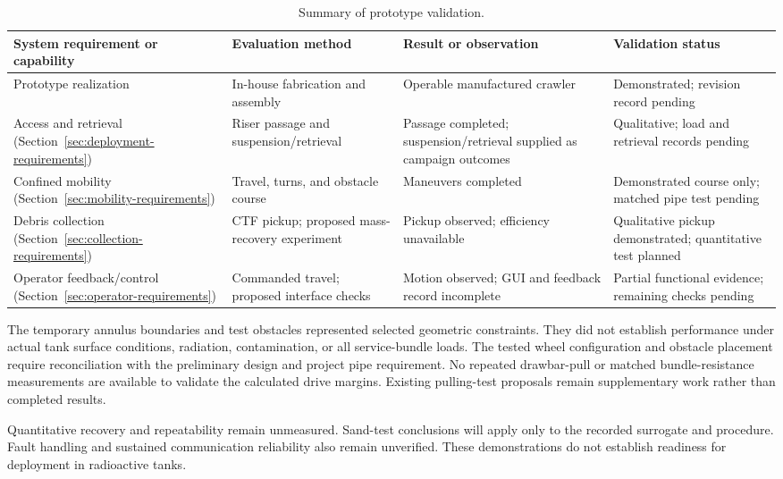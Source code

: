 \begin{table}[htbp]\centering
\caption{Summary of prototype validation.}
\label{tab:prototype-validation}
\begingroup\small\singlespacing\renewcommand{\arraystretch}{1.2}
\begin{tabularx}{\textwidth}{@{}XXXX@{}}\toprule
System requirement or capability & Evaluation method & Result or observation & Validation status \\\midrule
Prototype realization & In-house fabrication and assembly & Operable manufactured crawler & Demonstrated; revision record pending \\
Access and retrieval (Section~\ref{sec:deployment-requirements}) & Riser passage and suspension/retrieval & Passage completed; suspension/retrieval supplied as campaign outcomes & Qualitative; load and retrieval records pending \\
Confined mobility (Section~\ref{sec:mobility-requirements}) & Travel, turns, and obstacle course & Maneuvers completed & Demonstrated course only; matched pipe test pending \\
Debris collection (Section~\ref{sec:collection-requirements}) & CTF pickup; proposed mass-recovery experiment & Pickup observed; efficiency unavailable & Qualitative pickup demonstrated; quantitative test planned \\
Operator feedback/control (Section~\ref{sec:operator-requirements}) & Commanded travel; proposed interface checks & Motion observed; GUI and feedback record incomplete & Partial functional evidence; remaining checks pending \\
\bottomrule\end{tabularx}\endgroup
\end{table}

The temporary annulus boundaries and test obstacles represented selected geometric constraints. They did not establish performance under actual tank surface conditions, radiation, contamination, or all service-bundle loads. The tested wheel configuration and obstacle placement require reconciliation with the preliminary design and project pipe requirement. No repeated drawbar-pull or matched bundle-resistance measurements are available to validate the calculated drive margins. Existing pulling-test proposals remain supplementary work rather than completed results.

Quantitative recovery and repeatability remain unmeasured. Sand-test conclusions will apply only to the recorded surrogate and procedure. Fault handling and sustained communication reliability also remain unverified. These demonstrations do not establish readiness for deployment in radioactive tanks.
\par\endgroup
